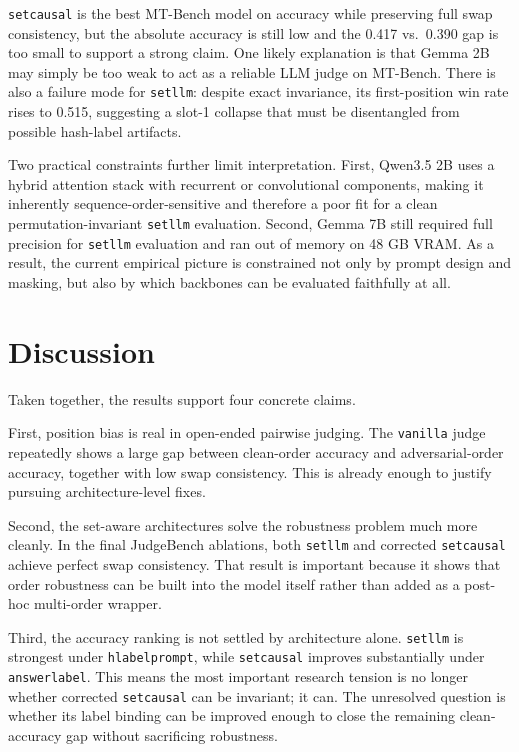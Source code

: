 \documentclass{article}
\begin{document}
\texttt{setcausal} is the best MT-Bench model on accuracy while preserving full swap consistency, but the absolute accuracy is still low and the 0.417 vs.\ 0.390 gap is too small to support a strong claim. One likely explanation is that Gemma 2B may simply be too weak to act as a reliable LLM judge on MT-Bench. There is also a failure mode for \texttt{setllm}: despite exact invariance, its first-position win rate rises to 0.515, suggesting a slot-1 collapse that must be disentangled from possible hash-label artifacts.

Two practical constraints further limit interpretation. First, Qwen3.5 2B uses a hybrid attention stack with recurrent or convolutional components, making it inherently sequence-order-sensitive and therefore a poor fit for a clean permutation-invariant \texttt{setllm} evaluation. Second, Gemma 7B still required full precision for \texttt{setllm} evaluation and ran out of memory on 48 GB VRAM. As a result, the current empirical picture is constrained not only by prompt design and masking, but also by which backbones can be evaluated faithfully at all.

\section{Discussion}

Taken together, the results support four concrete claims.

First, position bias is real in open-ended pairwise judging. The \texttt{vanilla} judge repeatedly shows a large gap between clean-order accuracy and adversarial-order accuracy, together with low swap consistency. This is already enough to justify pursuing architecture-level fixes.

Second, the set-aware architectures solve the robustness problem much more cleanly. In the final JudgeBench ablations, both \texttt{setllm} and corrected \texttt{setcausal} achieve perfect swap consistency. That result is important because it shows that order robustness can be built into the model itself rather than added as a post-hoc multi-order wrapper.

Third, the accuracy ranking is not settled by architecture alone. \texttt{setllm} is strongest under \texttt{hlabelprompt}, while \texttt{setcausal} improves substantially under \texttt{answerlabel}. This means the most important research tension is no longer whether corrected \texttt{setcausal} can be invariant; it can. The unresolved question is whether its label binding can be improved enough to close the remaining clean-accuracy gap without sacrificing robustness.
\end{document}
